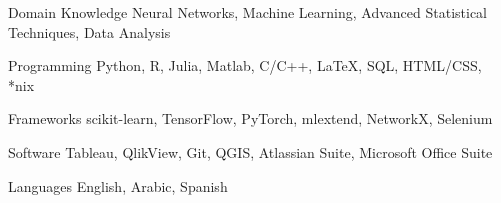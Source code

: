


\begin{cvskills}
\cvskill
{Domain Knowledge}
{Neural Networks, Machine Learning, Advanced Statistical Techniques, Data Analysis}


\cvskill
{Programming} %
{Python, R,  Julia, Matlab, C/C++, \LaTeX , SQL, HTML/CSS, *nix} %

\cvskill
{Frameworks} %
{scikit-learn, TensorFlow, PyTorch, mlextend, NetworkX, Selenium} %



\cvskill
{Software} %
{Tableau, QlikView, Git, QGIS, Atlassian Suite, Microsoft Office Suite} %


\cvskill
{Languages} %
{English, Arabic, Spanish} %


\end{cvskills}
